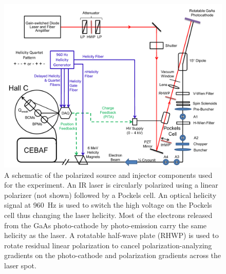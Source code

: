 \begin{figure}[!hbtbhbtb]
\centerline
{\includegraphics[width=\textwidth,angle=0]{Pictures/jlab_source.pdf}}
\caption{\label{fig:sourcetable} A schematic of the polarized source and injector components used for the \Qs experiment. An IR laser is circularly polarized using a linear polarizer (not shown) followed by a Pockels cell. An optical helicity signal at 960~Hz is used to switch the high voltage on the Pockels cell thus changing the laser helicity. Most of the electrons released from the GaAs photo-cathode by photo-emission carry the same helicity as the laser. A rotatable half-wave plate (RHWP) is used to rotate residual linear polarization to cancel polarization-analyzing gradients on the photo-cathode and polarization gradients across the laser spot.}
\end{figure}


